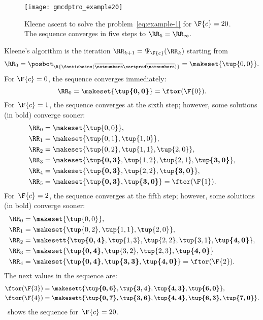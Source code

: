 \begin{figure}
    \begin{centering}
        \texttt{[image: gmcdptro\_example20]}
    \end{centering}
    \caption{Kleene ascent to solve the problem~\cref{eq:example-1} for $\F{c}=20$.
        The sequence converges in five steps to $\RR_{5}=\RR_{\infty}.
        $ }
    \label{fig:example24}
\end{figure}
%
Kleene's algorithm is the iteration $\RR_{k+1}=\Psi_{\F{c}}(\RR_{k})$
starting from \begin{equation}\RR_{0}=\posbot_{\R{\fantichains(\overline{\natnumbers}\cartprod\overline{\natnumbers})}}=\makeset{\tup{ 0,0} }.
\end{equation}
%
For $\F{c}=0$, the sequence converges immediately:
\begin{equation*}
    \RR_{0}=\makeset{\boldsymbol{\tup{0,0}}}=\ftor(\F{0}).
\end{equation*}
For~$\F{c}=1$, the sequence converges at the sixth step; however, some solutions (in bold) converge sooner:
\begin{align*}
    \RR_{0} & =\makeset{\tup{0,0} }, \\
    \RR_{1} & =\makeset{\tup{0,1},\tup{1,0}}, \\
    \RR_{2} & =\makeset{\tup{0,2},\tup{1,1}, \tup{2,0}}, \\
    \RR_{3} & =\makeset{\boldsymbol{\tup{0,3}},\tup{1,2}, \tup{2,1},\boldsymbol{\tup{3,0}}}, \\
    \RR_{4} & =\makeset{\boldsymbol{\tup{0,3}},\tup{2,2},\boldsymbol{\tup{3,0}}}, \\
    \RR_{5} & =\makeset{\boldsymbol{\tup{0,3}},\boldsymbol{\tup{3,0}}}=\ftor(\F{1}).
\end{align*}
For~$\F{c}=2$, the sequence converges at the fifth step; however,
some solutions (in bold) converge sooner:
\begin{align*}
    \RR_{0} & =\makeset{\tup{ 0,0} }, \\
    \RR_{1} & =\makeset{\tup{ 0,2} ,\tup{ 1,1} ,\tup{ 2,0} }, \\
    \RR_{2} & =\makesett{ \boldsymbol{\tup{ 0,4} }, \tup{1,3}, \tup{2,2}, \tup{3,1}, \boldsymbol{\tup{ 4,0} }} , \\
    \RR_{3} & =\makeset{\boldsymbol{\tup{0,4} },\tup{ 3,2}, \tup{2,3}, \boldsymbol{\tup{ 4,0} }} \\
    \RR_{4} & =\makeset{\boldsymbol{\tup{0,4} },\boldsymbol{\tup{ 3,3}},\boldsymbol{\tup{ 4,0} }}=\ftor(\F{2}).
\end{align*}
The next values in the sequence are:
\begin{align*}
    \ftor(\F{3}) & =\makesett{ \boldsymbol{\tup{ 0,6} },\boldsymbol{\tup{ 3,4} },\boldsymbol{\tup{ 4,3} },\boldsymbol{\tup{ 6,0} }} , \\
    \ftor(\F{4}) & =\makesett{ \boldsymbol{\tup{ 0,7} },\boldsymbol{\tup{ 3,6} },\boldsymbol{\tup{ 4,4} },\boldsymbol{\tup{ 6,3} },\boldsymbol{\tup{ 7,0} }} .
\end{align*}
~shows the sequence for~$\F{c}=20$.

